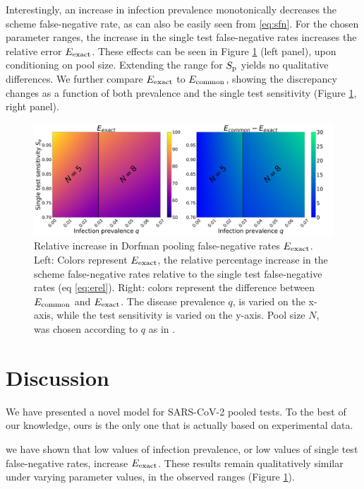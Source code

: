 \documentclass{article}
\begin{document}
Interestingly, an increase in infection prevalence monotonically
decreases the scheme false-negative rate, as can also be easily seen
from \eqref{eq:sfn}. For the chosen parameter ranges, the increase in
the single test false-negative rates increases the relative error
$E_{\text{{exact}}}$. These effects can be seen in Figure \ref{fig1} (left
panel), upon conditioning on pool size. Extending the range for $S_\text{p}$
yields no qualitative differences. We further compare $E_{\text{{exact}}}$ to
$E_{\text{{common}}}$, showing the discrepancy changes as a function of both
prevalence and the single test sensitivity (Figure \ref{fig1}, right
panel).
\begin{figure}[H]
  \centering
  \includegraphics[width=\textwidth]{heatmap_sfn.jpg}
  \caption{Relative increase in Dorfman pooling false-negative rates
    $E_{\text{{exact}}}$. Left: Colors represent $E_{\text{{exact}}}$, the relative
    percentage increase in the scheme false-negative rates relative
    to the single test false-negative rates (eq
    \eqref{eq:erel}). Right: colors represent the difference between
    $E_{\text{{common}}}$ and $E_{\text{{exact}}}$. The disease prevalence $q$, is
    varied on the x-axis, while the test sensitivity is varied on
    the y-axis. Pool size $N$, was chosen according to $q$ as in
    \cite{DorfmanYuvalDor}.}\label{fig1}
\end{figure}

\section*{Discussion}
We have presented a novel model for SARS-CoV-2 pooled tests. To the best of our knowledge, ours is the
only one that is actually based on experimental data.

we have shown that low values of infection prevalence, or
low values of single test false-negative rates, increase
$E_{\text{{exact}}}$. These results remain qualitatively similar under varying
parameter values, in the observed ranges
\cite{KitComparison,EstimatingRatesKucrika, EstimatingRatesLourenco,
  InterpretingCOVID19Test} (Figure \ref{fig1}).
\end{document}
